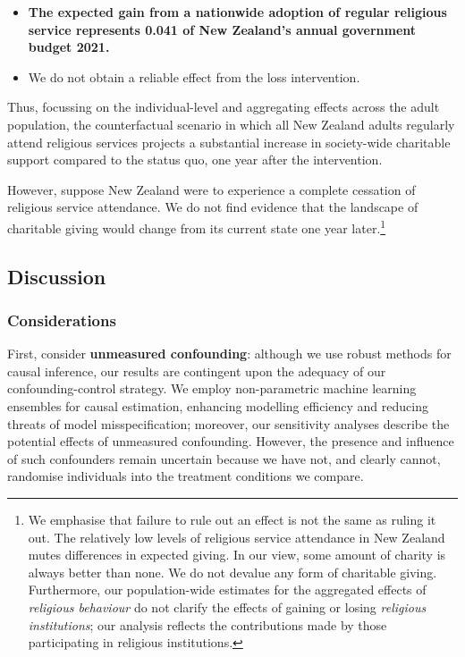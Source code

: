 \documentclass[
  single column]{article}
\providecommand{\tightlist}{%
  \setlength{\itemsep}{0pt}\setlength{\parskip}{0pt}}\usepackage{longtable,booktabs,array}
\begin{document}
\begin{itemize}
\tightlist
\item
  \textbf{The expected gain from a nationwide adoption of regular
  religious service represents 0.041 of New Zealand's annual government
  budget 2021.}
\item
  We do not obtain a reliable effect from the loss intervention.
\end{itemize}

Thus, focussing on the individual-level and aggregating effects across
the adult population, the counterfactual scenario in which all New
Zealand adults regularly attend religious services projects a
substantial increase in society-wide charitable support compared to the
status quo, one year after the intervention.

However, suppose New Zealand were to experience a complete cessation of
religious service attendance. We do not find evidence that the landscape
of charitable giving would change from its current state one year
later.\footnote{We emphasise that failure to rule out an effect is not
  the same as ruling it out. The relatively low levels of religious
  service attendance in New Zealand mutes differences in expected
  giving. In our view, some amount of charity is always better than
  none. We do not devalue any form of charitable giving. Furthermore,
  our population-wide estimates for the aggregated effects of
  \emph{religious behaviour} do not clarify the effects of gaining or
  losing \emph{religious institutions}; our analysis reflects the
  contributions made by those participating in religious institutions.}

\subsection{Discussion}\label{discussion}

\subsubsection{Considerations}\label{considerations}

First, consider \textbf{unmeasured confounding}: although we use robust
methods for causal inference, our results are contingent upon the
adequacy of our confounding-control strategy. We employ non-parametric
machine learning ensembles for causal estimation, enhancing modelling
efficiency and reducing threats of model misspecification; moreover, our
sensitivity analyses describe the potential effects of unmeasured
confounding. However, the presence and influence of such confounders
remain uncertain because we have not, and clearly cannot, randomise
individuals into the treatment conditions we compare.
\end{document}
